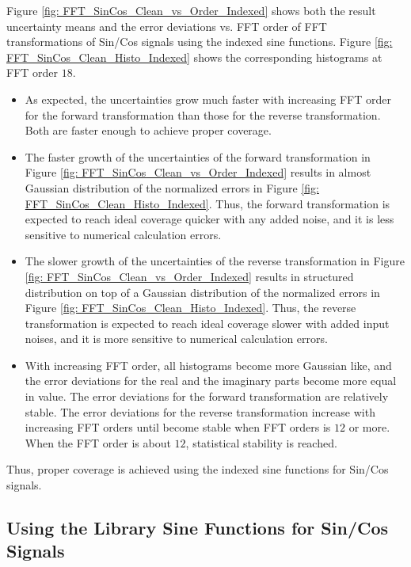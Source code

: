 \documentclass[twoside]{article}
\numberwithin{equation}{section}
\begin{document}
Figure \ref{fig: FFT_SinCos_Clean_vs_Order_Indexed} shows both the result uncertainty means and the error deviations vs. FFT order of FFT transformations of Sin/Cos signals using the indexed sine functions.
Figure \ref{fig: FFT_SinCos_Clean_Histo_Indexed} shows the corresponding histograms at FFT order $18$.
\begin{itemize}
\item As expected, the uncertainties grow much faster with increasing FFT order for the forward transformation than those for the reverse transformation.
Both are faster enough to achieve proper coverage. 

\item The faster growth of the uncertainties of the forward transformation in Figure \ref{fig: FFT_SinCos_Clean_vs_Order_Indexed} results in almost Gaussian distribution of the normalized errors in Figure \ref{fig: FFT_SinCos_Clean_Histo_Indexed}.
Thus, the forward transformation is expected to reach ideal coverage quicker with any added noise, and it is less sensitive to numerical calculation errors.

\item The slower growth of the uncertainties of the reverse transformation in Figure \ref{fig: FFT_SinCos_Clean_vs_Order_Indexed} results in structured distribution on top of a Gaussian distribution of the normalized errors in Figure \ref{fig: FFT_SinCos_Clean_Histo_Indexed}.
Thus, the reverse transformation is expected to reach ideal coverage slower with added input noises, and it is more sensitive to numerical calculation errors.

\item With increasing FFT order, all histograms become more Gaussian like, and the error deviations for the real and the imaginary parts become more equal in value.
The error deviations for the forward transformation are relatively stable.
The error deviations for the reverse transformation increase with increasing FFT orders until become stable when FFT orders is $12$ or more.
When the FFT order is about $12$, statistical stability is reached.
 
\end{itemize}

Thus, proper coverage is achieved using the indexed sine functions for Sin/Cos signals.


\subsection{Using the Library Sine Functions for Sin/Cos Signals}
\end{document}
